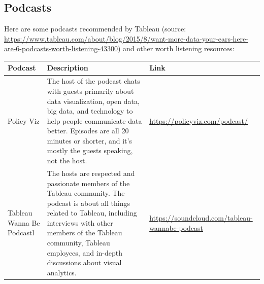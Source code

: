 \documentclass[]{book}
\begin{document}
\hypertarget{podcasts}{%
\subsection{Podcasts}\label{podcasts}}

Here are some podcasts recommended by Tableau (source: \url{https://www.tableau.com/about/blog/2015/8/want-more-data-your-ears-here-are-6-podcasts-worth-listening-43300}) and other worth listening resources:

\begin{longtable}[]{@{}lll@{}}
\toprule
\begin{minipage}[b]{0.11\columnwidth}\raggedright
\textbf{Podcast}\strut
\end{minipage} & \begin{minipage}[b]{0.68\columnwidth}\raggedright
\textbf{Description}\strut
\end{minipage} & \begin{minipage}[b]{0.11\columnwidth}\raggedright
\textbf{Link}\strut
\end{minipage}\tabularnewline
\midrule
\endhead
\begin{minipage}[t]{0.11\columnwidth}\raggedright
Policy Viz\strut
\end{minipage} & \begin{minipage}[t]{0.68\columnwidth}\raggedright
The host of the podcast chats with guests primarily about data visualization, open data, big data, and technology to help people communicate data better. Episodes are all 20 minutes or shorter, and it's mostly the guests speaking, not the host.\strut
\end{minipage} & \begin{minipage}[t]{0.11\columnwidth}\raggedright
\url{https://policyviz.com/podcast/}\strut
\end{minipage}\tabularnewline
\begin{minipage}[t]{0.11\columnwidth}\raggedright
Tableau Wanna Be Podcastl\strut
\end{minipage} & \begin{minipage}[t]{0.68\columnwidth}\raggedright
The hosts are respected and passionate members of the Tableau community. The podcast is about all things related to Tableau, including interviews with other members of the Tableau community, Tableau employees, and in-depth discussions about visual analytics.\strut
\end{minipage} & \begin{minipage}[t]{0.11\columnwidth}\raggedright
\url{https://soundcloud.com/tableau-wannabe-podcast}\strut

\end{minipage}
\end{longtable}
\end{document}
